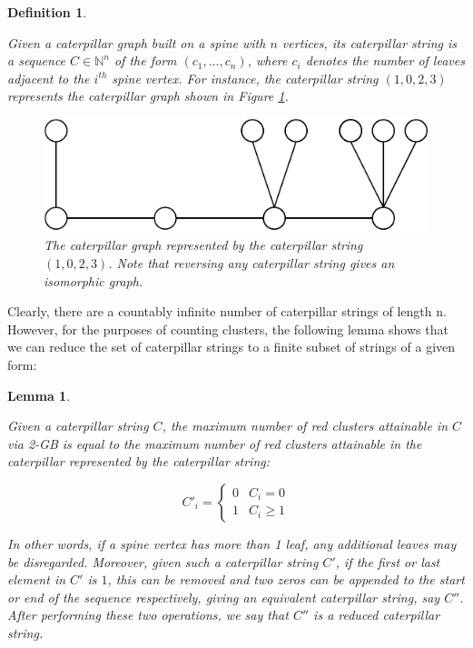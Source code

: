 \documentclass{mpaper}
\newtheorem{definition}[theorem]{Definition}
\newtheorem{lemma}[theorem]{Lemma}
\begin{document}
\begin{definition}
  \label{def/caterpillar-strings}

  Given a caterpillar graph built on a spine with $n$ vertices, its \emph{caterpillar string} is a sequence $C \in \mathbb{N}^n$ of the form $(c_1, \dots, c_n)$, where $c_i$ denotes the number of leaves adjacent to the $i^{th}$ spine vertex. For instance, the caterpillar string $(1,0,2,3)$ represents the caterpillar graph shown in Figure \ref{fig/test-caterpillar-string}.
  
  \begin{figure}
      \centering
      \includegraphics{mpaper/figures/testCaterpillarString.pdf}
      \caption{The caterpillar graph represented by the caterpillar string $(1,0,2,3)$. Note that reversing any caterpillar string gives an isomorphic graph.}
      \label{fig/test-caterpillar-string}
  \end{figure}
  
  

\end{definition}

Clearly, there are a countably infinite number of caterpillar strings of length n. However, for the purposes of counting clusters, the following lemma shows that we can reduce the set of caterpillar strings to a finite subset of strings of a given form:

\begin{lemma}
  \label{lem/reduced-caterpillars}

  Given a caterpillar string $C$, the maximum number of red clusters attainable in $C$ via 2-GB is equal to the maximum number of red clusters attainable in the caterpillar represented by the caterpillar string:

  \begin{equation*}
  C'_i = \begin{cases}
    0 & C_i = 0 \\
    1 & C_i \geq 1
  \end{cases}
  \end{equation*}

  In other words, if a spine vertex has more than 1 leaf, any additional leaves may be disregarded. Moreover, given such a caterpillar string $C'$, if the first or last element in $C'$ is $1$, this can be removed and two zeros can be appended to the start or end of the sequence respectively, giving an equivalent caterpillar string, say $C''$. After performing these two operations, we say that $C''$ is a \emph{reduced caterpillar string}.
\end{lemma}
\end{document}
